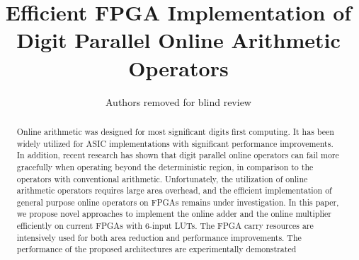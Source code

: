 \documentclass[conference]{IEEEtran}
\begin{document}
\title{Efficient FPGA Implementation of\\ Digit Parallel Online Arithmetic Operators}


\author{Authors removed for blind review}

\maketitle


\begin{abstract}
Online arithmetic was designed for most significant digits first computing. It has been widely utilized for ASIC implementations with significant performance improvements. In addition, recent research has shown that digit parallel online operators can fail more gracefully when operating beyond the deterministic region, in comparison to the operators with conventional arithmetic. Unfortunately, the utilization of online arithmetic operators requires large area overhead, and the efficient implementation of general purpose online operators on FPGAs remains under investigation. In this paper, we propose novel approaches to implement the online adder and the online multiplier efficiently on current FPGAs with 6-input LUTs. The FPGA carry resources are intensively used for both area reduction and performance improvements. The performance of the proposed architectures are experimentally demonstrated 



 
\end{abstract}


%
\end{document}
